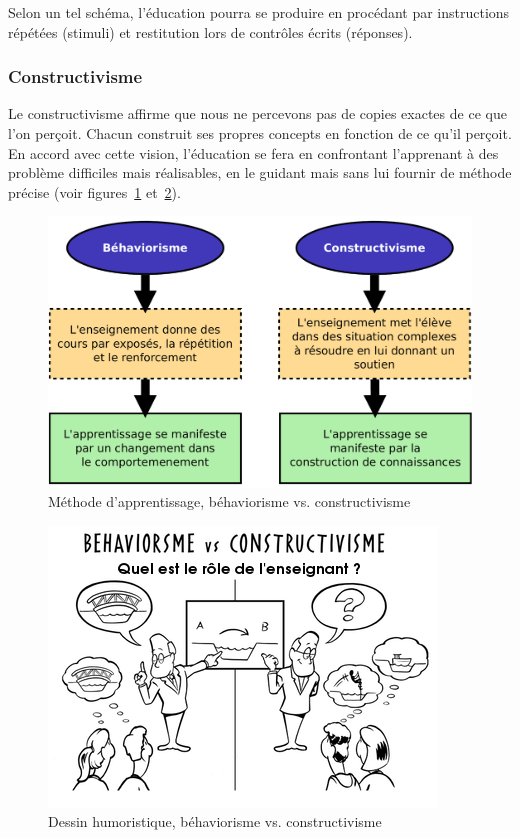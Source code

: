 Selon un tel schéma, l'éducation pourra se produire en procédant par instructions répétées (stimuli) et restitution lors de contrôles écrits (réponses).

\subsubsection{Constructivisme}
Le constructivisme affirme que nous ne percevons pas de copies exactes de ce que l'on perçoit. Chacun construit ses propres concepts en fonction de ce qu'il perçoit. En accord avec cette vision, l'éducation se fera en confrontant l'apprenant à des problème difficiles mais réalisables, en le guidant mais sans lui fournir de méthode précise (voir figures~\ref{fig:behaviorisme_vs_constructivisme_illu} et~\ref{fig:behaviorisme_vs_constructivisme_dessin}).

\begin{figure}[H]
  \centering
  \includegraphics[width=\textwidth]{../resources/illustrations/behaviorisme_constructivisme}
  \caption{Méthode d'apprentissage, béhaviorisme vs. constructivisme}
  \label{fig:behaviorisme_vs_constructivisme_illu}
\end{figure}
\begin{figure}[H]
  \centering
  \includegraphics[width=\textwidth]{../resources/illustrations/behaviorisme_vs_constructivisme}
  \caption{Dessin humoristique, béhaviorisme vs. constructivisme}
  \label{fig:behaviorisme_vs_constructivisme_dessin}
\end{figure}

